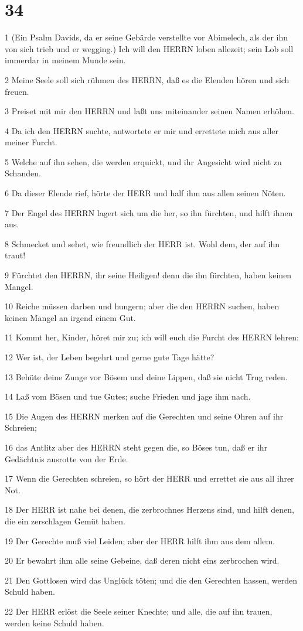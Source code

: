 \chapter{34}

\par 1 (Ein Psalm Davids, da er seine Gebärde verstellte vor Abimelech, als der ihn von sich trieb und er wegging.) Ich will den HERRN loben allezeit; sein Lob soll immerdar in meinem Munde sein.
\par 2 Meine Seele soll sich rühmen des HERRN, daß es die Elenden hören und sich freuen.
\par 3 Preiset mit mir den HERRN und laßt uns miteinander seinen Namen erhöhen.
\par 4 Da ich den HERRN suchte, antwortete er mir und errettete mich aus aller meiner Furcht.
\par 5 Welche auf ihn sehen, die werden erquickt, und ihr Angesicht wird nicht zu Schanden.
\par 6 Da dieser Elende rief, hörte der HERR und half ihm aus allen seinen Nöten.
\par 7 Der Engel des HERRN lagert sich um die her, so ihn fürchten, und hilft ihnen aus.
\par 8 Schmecket und sehet, wie freundlich der HERR ist. Wohl dem, der auf ihn traut!
\par 9 Fürchtet den HERRN, ihr seine Heiligen! denn die ihn fürchten, haben keinen Mangel.
\par 10 Reiche müssen darben und hungern; aber die den HERRN suchen, haben keinen Mangel an irgend einem Gut.
\par 11 Kommt her, Kinder, höret mir zu; ich will euch die Furcht des HERRN lehren:
\par 12 Wer ist, der Leben begehrt und gerne gute Tage hätte?
\par 13 Behüte deine Zunge vor Bösem und deine Lippen, daß sie nicht Trug reden.
\par 14 Laß vom Bösen und tue Gutes; suche Frieden und jage ihm nach.
\par 15 Die Augen des HERRN merken auf die Gerechten und seine Ohren auf ihr Schreien;
\par 16 das Antlitz aber des HERRN steht gegen die, so Böses tun, daß er ihr Gedächtnis ausrotte von der Erde.
\par 17 Wenn die Gerechten schreien, so hört der HERR und errettet sie aus all ihrer Not.
\par 18 Der HERR ist nahe bei denen, die zerbrochnes Herzens sind, und hilft denen, die ein zerschlagen Gemüt haben.
\par 19 Der Gerechte muß viel Leiden; aber der HERR hilft ihm aus dem allem.
\par 20 Er bewahrt ihm alle seine Gebeine, daß deren nicht eins zerbrochen wird.
\par 21 Den Gottlosen wird das Unglück töten; und die den Gerechten hassen, werden Schuld haben.
\par 22 Der HERR erlöst die Seele seiner Knechte; und alle, die auf ihn trauen, werden keine Schuld haben.

